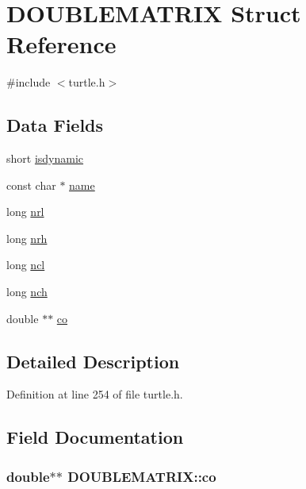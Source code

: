 \hypertarget{struct_d_o_u_b_l_e_m_a_t_r_i_x}{\section{D\-O\-U\-B\-L\-E\-M\-A\-T\-R\-I\-X Struct Reference}
\label{struct_d_o_u_b_l_e_m_a_t_r_i_x}
}


{\ttfamily \#include $<$turtle.\-h$>$}

\subsection*{Data Fields}
\begin{DoxyCompactItemize}
\item 
short \hyperlink{struct_d_o_u_b_l_e_m_a_t_r_i_x_a1e62e4f9e5746683445d8ff382a182e1}{isdynamic}
\item 
const char $\ast$ \hyperlink{struct_d_o_u_b_l_e_m_a_t_r_i_x_a5ed15a13d3cf9c47b252b8a3e40035e9}{name}
\item 
long \hyperlink{struct_d_o_u_b_l_e_m_a_t_r_i_x_a6f4071b0e6af474b928d8e688027f1fb}{nrl}
\item 
long \hyperlink{struct_d_o_u_b_l_e_m_a_t_r_i_x_a67fef4ae203dbb76bac4c2dbd166559c}{nrh}
\item 
long \hyperlink{struct_d_o_u_b_l_e_m_a_t_r_i_x_aa079f8e820b50f702e78c75f462a429a}{ncl}
\item 
long \hyperlink{struct_d_o_u_b_l_e_m_a_t_r_i_x_acdddfd825d76dd0f7ee77803548b481c}{nch}
\item 
double $\ast$$\ast$ \hyperlink{struct_d_o_u_b_l_e_m_a_t_r_i_x_a8a62617ea60e1057f35caf43e2e2a67d}{co}
\end{DoxyCompactItemize}


\subsection{Detailed Description}


Definition at line 254 of file turtle.\-h.



\subsection{Field Documentation}
\hypertarget{struct_d_o_u_b_l_e_m_a_t_r_i_x_a8a62617ea60e1057f35caf43e2e2a67d}{
\subsubsection[{co}]{\setlength{\rightskip}{0pt plus 5cm}double$\ast$$\ast$ D\-O\-U\-B\-L\-E\-M\-A\-T\-R\-I\-X\-::co}}\label{struct_d_o_u_b_l_e_m_a_t_r_i_x_a8a62617ea60e1057f35caf43e2e2a67d}


